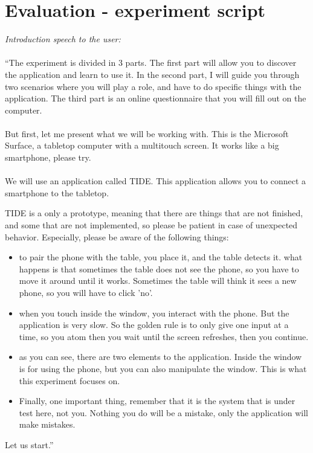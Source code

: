 \chapter{Evaluation - experiment script}
\label{app:evalscript}

\emph{Introduction speech to the user:}
\\\\
``The experiment is divided in 3 parts.
The first part will allow you to discover the application and learn to use it.
In the second part, I will guide you through two scenarios where you will play a role, and have to do specific things with the application.
The third part is an online questionnaire that you will fill out on the computer.
\\\\
But first, let me present what we will be working with.
This is the Microsoft Surface, a tabletop computer with a multitouch screen.
It works like a big smartphone, please try.
\\\\
We will use an application called TIDE.
This application allows you to connect a smartphone to the tabletop.

TIDE is a only a prototype, meaning that there are things that are not finished, and some that are not implemented, so please be patient in case of unexpected behavior.
Especially, please be aware of the following things:
\begin{itemize}
\item to pair the phone with the table, you place it, and the table detects it. what happens is that sometimes the table does not see the phone, so you have to move it around until it works. Sometimes the table will think it sees a new phone, so you will have to click 'no'.
\item when you touch inside the window, you interact with the phone. But the application is very slow. So the golden rule is to only give one input at a time, so you atom then you wait until the screen refreshes, then you continue.
\item as you can see, there are two elements to the application. Inside the window is for using the phone, but you can also manipulate the window. This is what this experiment focuses on.
\item Finally, one important thing, remember that it is the system that is under test here, not you. Nothing you do will be a mistake, only the application will make mistakes.
\end{itemize}
Let us start.''

